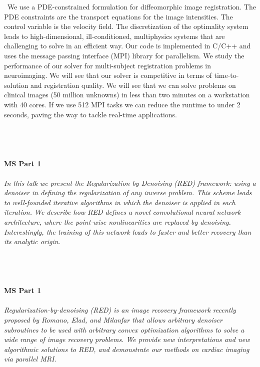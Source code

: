\begin{multicols}{2}
{\
We use a PDE-constrained formulation for diffeomorphic image registration. The PDE constraints are the transport equations for the image intensities. The control variable is the velocity field. The discretization of the optimality system leads to high-dimensional, ill-conditioned, multiphysics systems that are challenging to solve in an efficient way. Our code is implemented in C/C++ and uses the message passing interface (MPI) library for parallelism. We study the performance of our solver for multi-subject registration problems in neuroimaging. We will see that our solver is competitive in terms of time-to-solution and registration quality. We will see that we can solve problems on clinical images (50 million unknowns) in less than two minutes on a workstation with 40 cores. If we use 512 MPI tasks we can reduce the runtime to under 2 seconds, paving the way to tackle real-time applications.}\\
\\ 
    \\
    \\\\
    \noindent\textbf{MS Part 1}\\
\\  
    \textit{In this talk we present the Regularization by Denoising (RED) framework: using a denoiser in defining the regularization of any inverse problem. This scheme leads to well-founded iterative algorithms in which the denoiser is applied in each iteration. We describe how RED defines a novel convolutional neural network architecture, where the point-wise nonlinearities are replaced by denoising. Interestingly, the training of this network leads to faster and better recovery than its analytic origin.}\\
\\ 
    \\
    \\\\
    \noindent\textbf{MS Part 1}\\
\\  
    \textit{Regularization-by-denoising (RED) is an image recovery framework recently proposed by Romano, Elad, and Milanfar that allows arbitrary denoiser subroutines to be used with arbitrary convex optimization algorithms to solve a wide range of image recovery problems. We provide new interpretations and new algorithmic solutions to RED, and demonstrate our methods on cardiac imaging via parallel MRI.}\\

\end{multicols}
